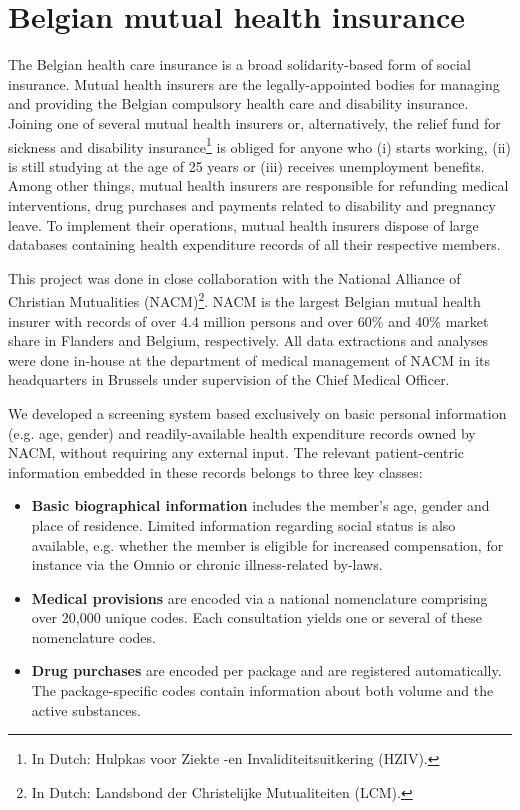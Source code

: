 \section{Belgian mutual health insurance} \label{intro:health-insurance}
The Belgian health care insurance is a broad solidarity-based form of social insurance. Mutual health insurers are the legally-appointed bodies for managing and providing the Belgian compulsory health care and disability insurance. Joining one of several mutual health insurers or, alternatively, the relief fund for sickness and disability insurance\footnote{In Dutch: Hulpkas voor Ziekte -en Invaliditeitsuitkering (HZIV).} is obliged for anyone who (i) starts working, (ii) is still studying at the age of 25 years or (iii) receives unemployment benefits. Among other things, mutual health insurers are responsible for refunding medical interventions, drug purchases and payments related to disability and pregnancy leave. To implement their operations, mutual health insurers dispose of large databases containing health expenditure records of all their respective members. 

This project was done in close collaboration with the National Alliance of Christian Mutualities (NACM)\footnote{In Dutch: Landsbond der Christelijke Mutualiteiten (LCM).}. NACM  is the largest Belgian mutual health insurer with records of over 4.4 million persons and over 60\% and 40\% market share in Flanders and Belgium, respectively. All data extractions and analyses were done in-house at the department of medical management of NACM in its headquarters in Brussels under supervision of the Chief Medical Officer.

We developed a screening system based exclusively on basic personal information (e.g. age, gender) and readily-available health expenditure records owned by NACM, without requiring any external input. The relevant patient-centric information embedded in these records belongs to three key classes:
\begin{itemize}
\item \textbf{Basic biographical information} includes the member's age, gender and place of residence. Limited information regarding social status is also available, e.g. whether the member is eligible for increased compensation, for instance via the Omnio or chronic illness-related by-laws.
\item \textbf{Medical provisions} are encoded via a national nomenclature comprising over 20,000 unique codes. Each consultation yields one or several of these nomenclature codes. 
\item \textbf{Drug purchases} are encoded per package and are registered automatically. The package-specific codes contain information about both volume and the active substances. 
\end{itemize}


